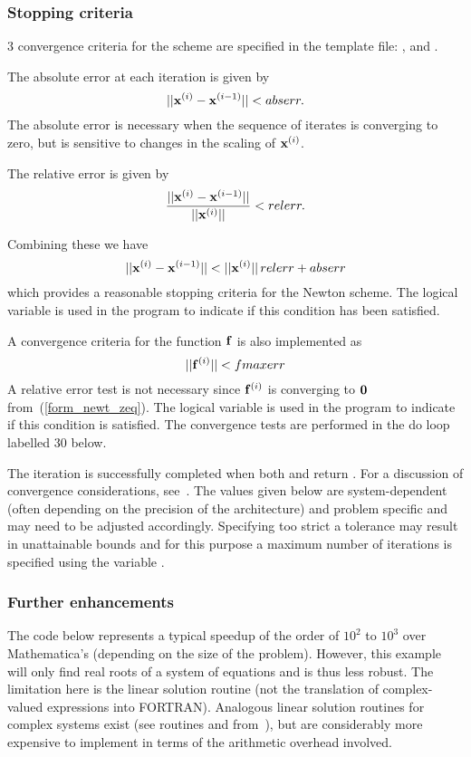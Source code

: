\documentclass [12pt,twoside]{article}
\begin{document}
\pagebreak[2]

\subsubsection{Stopping criteria}
$3$ convergence criteria for the scheme are specified in the template file:
,  and .

\noindent
The absolute error at each iteration is given by
\[ || {\bf x}^{(i)} - {\bf x}^{(i-1)} || < abserr. \]
The absolute error is necessary when the sequence of iterates is
converging to zero, but is sensitive to changes in the scaling of
${\bf x}^{(i)}$.

\noindent
The relative error is given by
\[ \frac{|| {\bf x}^{(i)} - {\bf x}^{(i-1)} ||}{|| {\bf x}^{(i)} ||} < relerr.
\]

\noindent
Combining these we have
\[ || {\bf x}^{(i)} - {\bf x}^{(i-1)} || < || {\bf x}^{(i)} || \, relerr + abserr
\] which provides a reasonable stopping criteria for the Newton scheme. The
logical variable  is used in the program to indicate if this condition
has been satisfied.

\noindent
A convergence criteria for the function ${\bf f}$ is also implemented as
\[ || {\bf f}^{(i)} || < fmaxerr \]
A relative error test is not necessary since ${\bf f}^{(i)}$ is converging to
${\bf 0}$ from~(\ref{form_newt_zeq}). The logical variable  is used in the
program to indicate if this condition is satisfied. The convergence tests are performed in
the do loop labelled 30 below.

The iteration is successfully completed when both  and 
return . For a discussion of convergence considerations,
see~\cite{parker-89}. The values given below are system-dependent (often
depending on the precision of the architecture) and problem specific and may
need to be adjusted accordingly. Specifying too strict a tolerance may result
in unattainable bounds and for this purpose a maximum number of iterations is
specified using the variable . 

\subsubsection{Further enhancements}
The code below represents a typical speedup of the order of $10^2$ to $10^3$ over
Mathematica's  (depending on the size of the problem). However, this
example will only find real roots of a system of equations and is thus less
robust. The limitation here is the linear solution routine (not the translation
of complex-valued expressions into FORTRAN). Analogous linear solution routines
for complex systems exist (see routines  and 
from~\cite{lapack}), but are considerably more expensive to implement in terms
of the arithmetic overhead involved.
\end{document}
